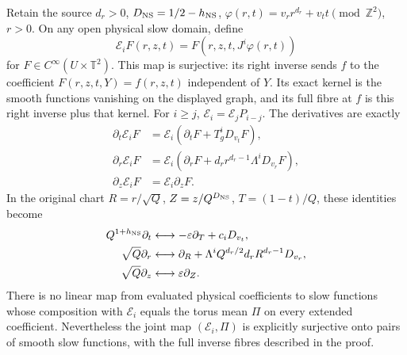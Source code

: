\begin{theorem}
\label{thm:ns-physical-evaluation-fibre}
Retain the source $d_r>0$, $D_{\rm NS}=1/2-h_{\rm NS}$,
$\varphi(r,t)=v_rr^{d_r}+v_tt\pmod{\mathbb Z^2}$, $r>0$.
On any open physical slow domain, define
\[
 \mathcal E_iF(r,z,t)=F(r,z,t,J^i\varphi(r,t))
\]
for $F\in C^\infty(U\times\mathbb T^2)$. This map is
surjective: its right inverse sends $f$ to the coefficient
$F(r,z,t,Y)=f(r,z,t)$ independent of $Y$. Its exact kernel
is the smooth functions vanishing on the displayed graph,
and its full fibre at $f$ is this right inverse plus that
kernel. For $i\ge j$, $\mathcal E_i=\mathcal E_jP_{i-j}$.
The derivatives are exactly
\[
\begin{aligned}
 \partial_t\mathcal E_iF
 &=\mathcal E_i(\partial_tF+T_g^iD_{v_t}F),\\
 \partial_r\mathcal E_iF
 &=\mathcal E_i(\partial_rF+d_rr^{d_r-1}\Lambda^iD_{v_r}F),\\
 \partial_z\mathcal E_iF&=\mathcal E_i\partial_zF.
\end{aligned}
\]
In the original chart $R=r/\sqrt Q$, $Z=z/Q^{D_{\rm NS}}$,
$T=(1-t)/Q$, these identities become
\[
\begin{aligned}
 Q^{1+h_{\rm NS}}\partial_t&\longleftrightarrow
       -\varepsilon\partial_T+c_iD_{v_t},\\
 \sqrt Q\partial_r&\longleftrightarrow
       \partial_R+\Lambda^iQ^{d_r/2}d_rR^{d_r-1}D_{v_r},\\
 \sqrt Q\partial_z&\longleftrightarrow\varepsilon\partial_Z.
\end{aligned}
\]
There is no linear map from evaluated physical coefficients
to slow functions whose composition with $\mathcal E_i$
equals the torus mean $\Pi$ on every extended coefficient.
Nevertheless the joint map $(\mathcal E_i,\Pi)$ is explicitly
surjective onto pairs of smooth slow functions, with the
full inverse fibres described in the proof.
\end{theorem}
